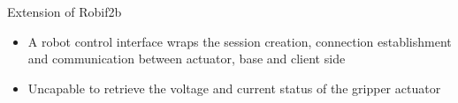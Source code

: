 \documentclass[aspectratio=169]{beamer}
\begin{document}

\begin{frame}{Extension of Robif2b}
\begin{itemize}
  \item A robot control interface wraps the
  session creation, connection establishment and communication between actuator, base and client side \cite{Rosym-Project}
  \item Uncapable to retrieve the voltage and current status of the gripper actuator
  \sleepSort
\end{itemize}
\end{frame}
\end{document}
